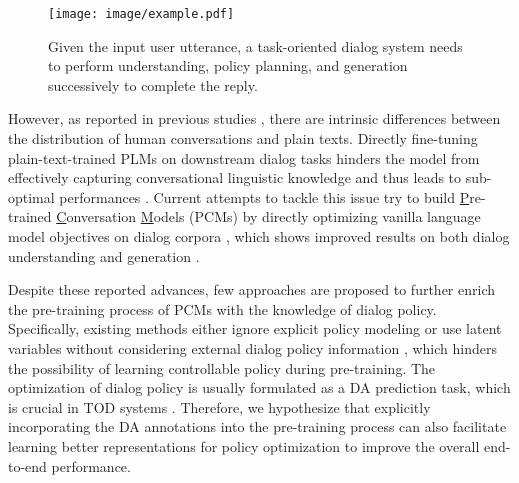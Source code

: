 \documentclass[letterpaper]{article} \usepackage{aaai22}  \usepackage{times}  \usepackage{helvet}  \usepackage{courier}  \usepackage[hyphens]{url}  \usepackage{graphicx} \urlstyle{rm} \def\UrlFont{\rm}  \usepackage{natbib}  \usepackage{caption} \DeclareCaptionStyle{ruled}{labelfont=normalfont,labelsep=colon,strut=off} \frenchspacing  \setlength{\pdfpagewidth}{8.5in}  \setlength{\pdfpageheight}{11in}  \usepackage{algorithm}
\begin{document}
\begin{figure}
    \centering
    \texttt{[image: image/example.pdf]}
    \caption{Given the input user utterance, a task-oriented dialog system needs to perform understanding, policy planning, and generation successively to complete  the reply.}
    \label{fig:example}
\end{figure}

However, as reported in previous studies \cite{zhang2019dialogpt, kulhanek2021augpt}, there are intrinsic differences between the distribution of human conversations and plain texts. Directly fine-tuning plain-text-trained PLMs on downstream dialog tasks hinders the model from effectively capturing conversational linguistic knowledge and thus leads to sub-optimal performances \cite{mehri2019pretraining, zenginvestigation, wu2020probing}. Current attempts to tackle this issue try to build \underline{P}re-trained \underline{C}onversation \underline{M}odels (PCMs) by directly optimizing vanilla language model objectives on dialog corpora \cite{mehri2020dialoglue,zhang2019dialogpt, henderson2019convert}, which shows improved results on both dialog understanding \cite{wu2020tod} and generation \cite{peng2020few}.

Despite these reported advances, few approaches are proposed to further enrich the pre-training process of PCMs with the  knowledge of dialog policy.
Specifically, existing methods either ignore explicit policy modeling or use latent variables without considering external dialog policy information \cite{bao2020plato}, which hinders the possibility of learning controllable policy during pre-training.
The optimization of dialog policy is usually formulated as a DA prediction task, which is crucial in TOD systems \cite{su2017sample,liu2018dialogue}.
Therefore, we hypothesize that explicitly incorporating the DA annotations into the  pre-training process can also facilitate learning better representations for policy optimization to improve the overall end-to-end performance. 
\end{document}
